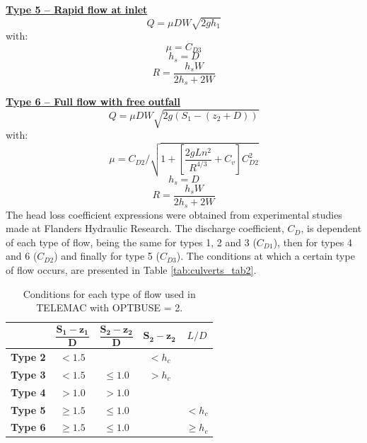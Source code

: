 \underline{\textbf{Type 5 -- Rapid flow at inlet}}\\
\begin{equation}
Q= \mu D W \sqrt{2gh_1}
\end{equation}
with:
\begin{equation}
\mu = C_{D3}
\end{equation}
\begin{equation}
h_s = D
\end{equation}
\begin{equation}
R = \dfrac{h_s W}{2h_s+2W}
\end{equation}

\underline{\textbf{Type 6 -- Full flow with free outfall}}\\
\begin{equation}
Q = \mu D W \sqrt{2g(S_1-(z_2+D))}
\end{equation}
with:
\begin{equation}
\mu = C_{D2}/\sqrt{1+\left[\dfrac{2gLn^2}{R^{4/3}} +C_v \right] C_{D2}^2}
\end{equation}
\begin{equation}
h_s=D
\end{equation}
\begin{equation}
R=\dfrac{h_s W}{2h_s+2W}
\end{equation}
The head loss coefficient expressions were obtained from experimental studies made at
Flanders Hydraulic Research.
The discharge coefficient, $C_D$, is dependent of each type of flow, being the same for
types 1, 2 and 3 ($C_{D1}$), then for types 4 and 6 ($C_{D2}$) and finally for type 5 ($C_{D3}$).
The conditions at which a certain type of flow occurs,
are presented in Table \ref{tab:culverts_tab2}.

\begin{table}[H]
\caption{Conditions for each type of flow used in TELEMAC with OPTBUSE = 2.}
\label{tab:culvert_tab2}
\begin{center}\begin{tabular}{|c|c|c|c|c|}
\hline
~ & $\mathbf{\dfrac{S_1-z_1}{D}}$ & $\mathbf{\dfrac{S_2-z_2}{D}}$ & $\mathbf{S_2-z_2}$ & $L/D$ \\
\hline
\textbf{Type 2} & $<1.5$    &  ~ & $< h_c$ & ~ \\
\hline
\textbf{Type 3} & $<1.5$    & $\le 1.0$ & $> h_c$ & ~\\
\hline
\textbf{Type 4} & $> 1.0$   & $> 1.0$ & ~ & ~\\
\hline
\textbf{Type 5} & $\ge 1.5$ & $\le 1.0$ & ~ & $< h_c$\\
\hline
\textbf{Type 6} & $\ge 1.5$ & $\le 1.0$  & ~ & $\ge h_c$\\
\hline
\end{tabular}\end{center}
\end{table}

